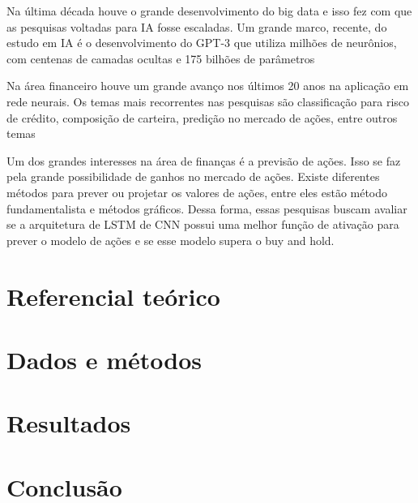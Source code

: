 \documentclass[preprint,12pt,authoryear]{elsarticle}
\begin{document}
Na última década houve o grande desenvolvimento do big data e isso fez com que as pesquisas voltadas para IA fosse escaladas. Um grande marco, recente, do estudo em IA é o desenvolvimento do GPT-3 que utiliza milhões de neurônios, com centenas de camadas ocultas e 175 bilhões de parâmetros \cite{openia}

Na área financeiro houve um grande avanço nos últimos 20 anos na aplicação em rede neurais. Os temas mais recorrentes nas pesquisas são classificação para risco de crédito, composição de carteira, predição no mercado de ações, entre outros temas \cite{herrmann2022}

Um dos grandes interesses na área de finanças é a previsão de ações. Isso se faz pela grande possibilidade de ganhos no mercado de ações. Existe diferentes métodos para prever ou projetar os valores de ações, entre eles estão método fundamentalista e métodos gráficos. Dessa forma, essas pesquisas buscam avaliar se a arquitetura de LSTM de CNN possui uma melhor função de ativação para prever o modelo de ações e se esse modelo supera o buy and hold.



\section{Referencial teórico}
\label{sec:theoretical}




\section{Dados e métodos}
\label{sec:data}



\section{Resultados}
\label{sec:result}


\section{Conclusão}
\label{sec:conclusion}




%
 

\end{document}
